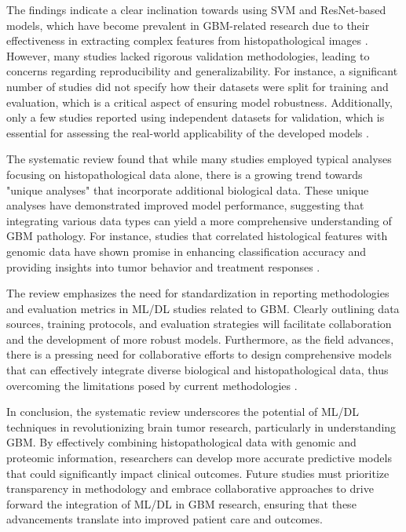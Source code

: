 \documentclass[runningheads]{llncs}
\begin{document}
The findings indicate a clear inclination towards using SVM and ResNet-based models, which have become prevalent in GBM-related research due to their effectiveness in extracting complex features from histopathological images \cite{Chun_2025}. However, many studies lacked rigorous validation methodologies, leading to concerns regarding reproducibility and generalizability. For instance, a significant number of studies did not specify how their datasets were split for training and evaluation, which is a critical aspect of ensuring model robustness. Additionally, only a few studies reported using independent datasets for validation, which is essential for assessing the real-world applicability of the developed models \cite{Chun_2025}.

The systematic review found that while many studies employed typical analyses focusing on histopathological data alone, there is a growing trend towards "unique analyses" that incorporate additional biological data. These unique analyses have demonstrated improved model performance, suggesting that integrating various data types can yield a more comprehensive understanding of GBM pathology. For instance, studies that correlated histological features with genomic data have shown promise in enhancing classification accuracy and providing insights into tumor behavior and treatment responses \cite{Chun_2025}. 

The review emphasizes the need for standardization in reporting methodologies and evaluation metrics in ML/DL studies related to GBM. Clearly outlining data sources, training protocols, and evaluation strategies will facilitate collaboration and the development of more robust models. Furthermore, as the field advances, there is a pressing need for collaborative efforts to design comprehensive models that can effectively integrate diverse biological and histopathological data, thus overcoming the limitations posed by current methodologies \cite{Chun_2025}. 

In conclusion, the systematic review underscores the potential of ML/DL techniques in revolutionizing brain tumor research, particularly in understanding GBM. By effectively combining histopathological data with genomic and proteomic information, researchers can develop more accurate predictive models that could significantly impact clinical outcomes. Future studies must prioritize transparency in methodology and embrace collaborative approaches to drive forward the integration of ML/DL in GBM research, ensuring that these advancements translate into improved patient care and outcomes.
\end{document}
